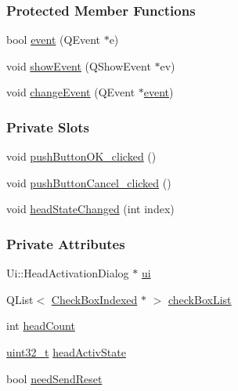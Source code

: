 \subsubsection*{Protected Member Functions}
\begin{DoxyCompactItemize}
\item 
bool \mbox{\hyperlink{classHeadActivationDialog_aff7339cd3040bfcdc4e86d6e83a2e2da}{event}} (Q\+Event $\ast$e)
\item 
void \mbox{\hyperlink{classHeadActivationDialog_ae61da7b66bf8a351a83667e518455a5b}{show\+Event}} (Q\+Show\+Event $\ast$ev)
\item 
void \mbox{\hyperlink{classHeadActivationDialog_a7ffe0f22086377330bbea7117ff404e0}{change\+Event}} (Q\+Event $\ast$\mbox{\hyperlink{classHeadActivationDialog_aff7339cd3040bfcdc4e86d6e83a2e2da}{event}})
\end{DoxyCompactItemize}
\subsubsection*{Private Slots}
\begin{DoxyCompactItemize}
\item 
void \mbox{\hyperlink{classHeadActivationDialog_a544834488f3b17daa84f2f126cd405b1}{push\+Button\+O\+K\+\_\+clicked}} ()
\item 
void \mbox{\hyperlink{classHeadActivationDialog_af75039537fd16f02263e12343f7655c6}{push\+Button\+Cancel\+\_\+clicked}} ()
\item 
void \mbox{\hyperlink{classHeadActivationDialog_a2a6c18f85c6e70dcd242f29b14b44219}{head\+State\+Changed}} (int index)
\end{DoxyCompactItemize}
\subsubsection*{Private Attributes}
\begin{DoxyCompactItemize}
\item 
Ui\+::\+Head\+Activation\+Dialog $\ast$ \mbox{\hyperlink{classHeadActivationDialog_a2099e5d65b57cda6318d5d88b06157f6}{ui}}
\item 
Q\+List$<$ \mbox{\hyperlink{classCheckBoxIndexed}{Check\+Box\+Indexed}} $\ast$ $>$ \mbox{\hyperlink{classHeadActivationDialog_ae6fb828d26fda5b86510b5e427f24d06}{check\+Box\+List}}
\item 
int \mbox{\hyperlink{classHeadActivationDialog_a0403b31877ebf58f738b9bfa68d31434}{head\+Count}}
\item 
\mbox{\hyperlink{settings_8h_a4196118492a3b1493c81f250e90af775}{uint32\+\_\+t}} \mbox{\hyperlink{classHeadActivationDialog_a720bae08173514106fd2bdfda9a8e902}{head\+Activ\+State}}
\item 
bool \mbox{\hyperlink{classHeadActivationDialog_ab86719bd4a08237cba25753be6f831e9}{need\+Send\+Reset}}
\end{DoxyCompactItemize}


